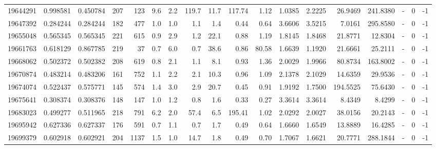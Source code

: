 \begin{tabular}{rrrrrrrrrrrrrrrlrr}
  19644291 & 0.998581 &   0.450784 &  207 &  123 &      9.6 &      2.2 &   119.7 &     11.7 &     117.74 &        1.12 &  1.0385 &  2.2225 &   26.9469 &  241.8380 &             - &        0 &         -1 \\
  19647392 & 0.284244 &   0.284244 &  182 &  477 &      1.0 &      1.0 &     1.1 &      1.4 &       0.44 &        0.64 &  3.6606 &  3.5215 &    7.0161 &  295.8580 &             - &        0 &         -1 \\
  19655048 & 0.565345 &   0.565345 &  221 &  615 &      0.9 &      2.9 &     1.2 &     22.1 &       0.88 &        1.19 &  1.8145 &  1.8468 &   21.8771 &   12.8304 &             - &        0 &         -1 \\
  19661763 & 0.618129 &   0.867785 &  219 &   37 &      0.7 &      6.0 &     0.7 &     38.6 &       0.86 &       80.58 &  1.6639 &  1.1920 &   21.6661 &   25.2111 &             - &        0 &         -1 \\
  19668062 & 0.502372 &   0.502382 &  208 &  619 &      0.8 &      2.1 &     1.1 &      8.1 &       0.93 &        1.36 &  2.0029 &  1.9966 &   80.8734 &  163.8002 &             - &        0 &         -1 \\
  19670874 & 0.483214 &   0.483206 &  161 &  752 &      1.1 &      2.2 &     2.1 &     10.3 &       0.96 &        1.09 &  2.1378 &  2.1029 &   14.6359 &   29.9536 &             - &        0 &         -1 \\
  19674074 & 0.522437 &   0.575771 &  145 &  574 &      1.4 &      3.0 &     2.9 &     20.7 &       0.45 &        0.91 &  1.9192 &  1.7500 &  194.5525 &   75.6430 &             - &        0 &         -1 \\
  19675641 & 0.308374 &   0.308376 &  148 &  147 &      1.0 &      1.2 &     0.8 &      1.6 &       0.33 &        0.27 &  3.3614 &  3.3614 &    8.4349 &    8.4299 &             - &        0 &         -1 \\
  19683023 & 0.499277 &   0.511965 &  218 &  791 &      6.2 &      2.0 &    57.4 &      6.5 &     195.41 &        1.02 &  2.0292 &  2.0027 &   38.0156 &   20.2143 &             - &        0 &         -1 \\
  19695942 & 0.627336 &   0.627337 &  176 &  591 &      0.7 &      1.1 &     0.7 &      1.7 &       0.49 &        0.64 &  1.6660 &  1.6549 &   13.8889 &   16.4285 &             - &        0 &         -1 \\
  19699379 & 0.602918 &   0.602921 &  204 & 1137 &      1.5 &      1.0 &    14.7 &      1.8 &       0.49 &        0.70 &  1.7067 &  1.6621 &   20.7771 &  288.1844 &             - &        0 &         -1 \\

\end{tabular}
